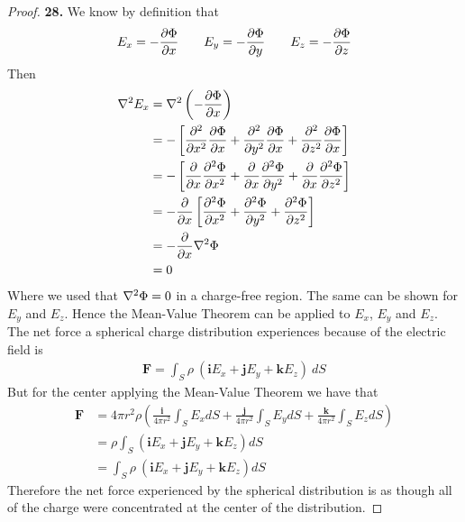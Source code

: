 \documentclass[11pt]{article}
\newcommand{\uvi}{\bm{i}}
\newcommand{\uvj}{\bm{j}}
\newcommand{\uvk}{\bm{k}}
\theoremstyle{definition}
\begin{document}
\begin{proof}{\textbf{28.}}
    We know by definition that
    \begin{align*}
        E_x = -\pdv{\Phi}{x} \qquad E_y = -\pdv{\Phi}{y} \qquad E_z = -\pdv{\Phi}{z}
    \end{align*}
    Then 
    \begin{align*}
        \laplacian E_x &= \laplacian \left(-\pdv{\Phi}{x}\right)\\
        &= -\left[\pdv[2]{x}\pdv{\Phi}{x} + \pdv[2]{y}\pdv{\Phi}{x}
        + \pdv[2]{z}\pdv{\Phi}{x}\right]\\
        &= -\left[\pdv{x}\pdv[2]{\Phi}{x} + \pdv{x}\pdv[2]{\Phi}{y}
        + \pdv{x}\pdv[2]{\Phi}{z}\right]\\
        &= -\pdv{x}\left[\pdv[2]{\Phi}{x} + \pdv[2]{\Phi}{y}
        + \pdv[2]{\Phi}{z}\right]\\
        &= -\pdv{x}\laplacian \Phi\\
        &= 0
    \end{align*}
    Where we used that $\laplacian\Phi = 0$ in a charge-free region.
    The same can be shown for $E_y$ and $E_z$.
    Hence the Mean-Value Theorem can be  applied to $E_x$, $E_y$ and $E_z$.
    The net force a spherical charge distribution experiences because of the
    electric field is
    \begin{align*}
        \bm{F} = \int_S\rho~(\uvi E_x + \uvj E_y + \uvk E_z)~dS
    \end{align*}
    But for the center applying the Mean-Value Theorem we have that
    \begin{align*}
        \bm{F} &= 4\pi r^2 \rho \left(
        \frac{\uvi}{4\pi r^2}\int_S E_x dS
        + \frac{\uvj}{4\pi r^2} \int_S E_y dS
        + \frac{\uvk}{4\pi r^2} \int_S E_z dS
        \right)\\
        &=  \rho \int_{S}(\uvi E_x + \uvj E_y + \uvk E_z) dS\\
        &=  \int_{S}\rho~(\uvi E_x + \uvj E_y + \uvk E_z) dS
    \end{align*}
    Therefore the net force experienced by the spherical distribution is as
    though all of the charge were concentrated at the center of the
    distribution.
\end{proof}
\cleardoublepage
\end{document}
